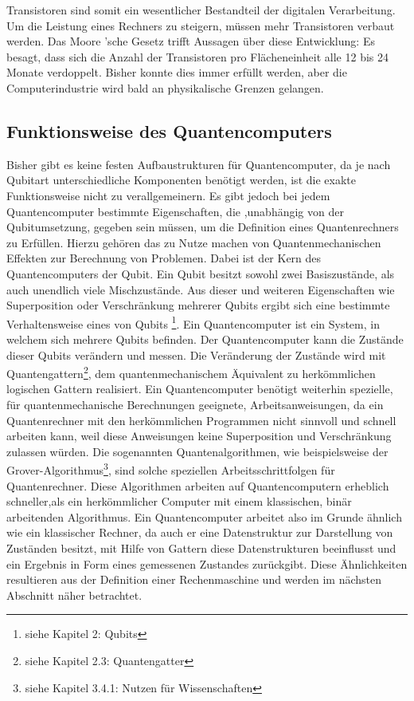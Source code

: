 \documentclass[12pt]{report}
\begin{document}
Transistoren sind somit ein wesentlicher Bestandteil der digitalen Verarbeitung. Um die Leistung eines Rechners zu steigern, müssen mehr Transistoren verbaut werden. Das Moore 'sche Gesetz trifft Aussagen über diese Entwicklung: Es besagt, dass sich die Anzahl der Transistoren pro Flächeneinheit alle 12 bis 24 Monate verdoppelt. Bisher konnte dies immer erfüllt werden, aber die Computerindustrie wird bald an physikalische Grenzen gelangen.

	\subsection{Funktionsweise des Quantencomputers}

Bisher gibt es keine festen Aufbaustrukturen für Quantencomputer, da je nach Qubitart unterschiedliche Komponenten benötigt werden, ist die exakte Funktionsweise nicht zu verallgemeinern. Es gibt jedoch bei jedem Quantencomputer bestimmte Eigenschaften, die ,unabhängig von der Qubitumsetzung, gegeben sein müssen, um die Definition eines Quantenrechners zu Erfüllen. \newline
Hierzu gehören das zu Nutze machen von Quantenmechanischen Effekten zur Berechnung von Problemen. 
Dabei ist der Kern des Quantencomputers der Qubit. Ein Qubit besitzt sowohl zwei Basiszustände, als auch unendlich viele Mischzustände. Aus dieser und weiteren Eigenschaften wie Superposition oder Verschränkung mehrerer Qubits ergibt sich eine bestimmte Verhaltensweise eines von Qubits \footnote{siehe Kapitel 2: Qubits}. 
Ein Quantencomputer ist ein System, in welchem sich mehrere Qubits befinden. Der Quantencomputer kann die Zustände dieser Qubits verändern und messen. Die Veränderung der Zustände wird mit Quantengattern\footnote{siehe Kapitel 2.3: Quantengatter}, dem quantenmechanischem Äquivalent zu herkömmlichen logischen Gattern realisiert.
Ein Quantencomputer benötigt weiterhin spezielle, für quantenmechanische Berechnungen geeignete, Arbeitsanweisungen, da ein Quantenrechner mit den herkömmlichen Programmen nicht sinnvoll und schnell arbeiten kann, weil diese Anweisungen keine Superposition und Verschränkung zulassen würden. Die sogenannten Quantenalgorithmen, wie beispielsweise der Grover-Algorithmus\footnote{siehe Kapitel 3.4.1: Nutzen für Wissenschaften}, sind solche speziellen Arbeitsschrittfolgen für Quantenrechner. Diese Algorithmen arbeiten auf Quantencomputern erheblich schneller,als ein herkömmlicher Computer mit einem klassischen, binär arbeitenden Algorithmus. Ein Quantencomputer arbeitet also im Grunde ähnlich wie ein klassischer Rechner, da auch er eine Datenstruktur zur Darstellung von Zuständen besitzt, mit Hilfe von Gattern diese Datenstrukturen beeinflusst und ein Ergebnis in Form eines gemessenen Zustandes zurückgibt. Diese Ähnlichkeiten resultieren aus der Definition einer Rechenmaschine und werden im nächsten Abschnitt näher betrachtet.  
\end{document}
